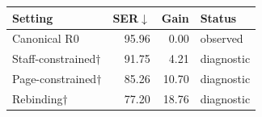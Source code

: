 \begin{center}
\begin{minipage}{\columnwidth}
\label{tab:polish-diagnostics}
\centering
\small
\setlength{\tabcolsep}{3pt}
\begin{tabular}{@{}lrrl@{}}
\toprule
Setting & SER$\downarrow$ & Gain & Status \\
\midrule
Canonical R0 & 95.96 & 0.00 & observed \\
Staff-constrained$\dagger$ & 91.75 & 4.21 & diagnostic \\
Page-constrained$\dagger$ & 85.26 & 10.70 & diagnostic \\
Rebinding$\dagger$ & 77.20 & 18.76 & diagnostic \\
\bottomrule
\end{tabular}
\end{minipage}
\end{center}

